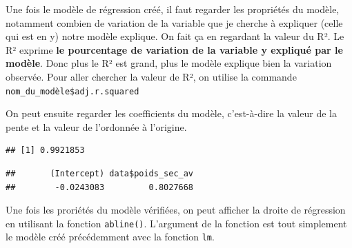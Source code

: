 \documentclass[
]{article}
\newenvironment{Shaded}{\begin{snugshade}}{\end{snugshade}}
\newcommand{\CommentTok}[1]{\textcolor[rgb]{0.56,0.35,0.01}{\textit{#1}}}
\newcommand{\KeywordTok}[1]{\textcolor[rgb]{0.13,0.29,0.53}{\textbf{#1}}}
\newcommand{\NormalTok}[1]{#1}
\newcommand{\OperatorTok}[1]{\textcolor[rgb]{0.81,0.36,0.00}{\textbf{#1}}}
\begin{document}
Une fois le modèle de régression créé, il faut regarder les propriétés
du modèle, notamment combien de variation de la variable que je cherche
à expliquer (celle qui est en y) notre modèle explique. On fait ça en
regardant la valeur du R². Le R² exprime \textbf{le pourcentage de
variation de la variable y expliqué par le modèle}. Donc plus le R² est
grand, plus le modèle explique bien la variation observée. Pour aller
chercher la valeur de R², on utilise la commande
\texttt{nom\_du\_modèle\$adj.r.squared}

On peut ensuite regarder les coefficients du modèle, c'est-à-dire la
valeur de la pente et la valeur de l'ordonnée à l'origine.

\begin{Shaded}
\end{Shaded}

\begin{verbatim}
## [1] 0.9921853
\end{verbatim}

\begin{Shaded}
\end{Shaded}

\begin{verbatim}
##       (Intercept) data$poids_sec_av 
##        -0.0243083         0.8027668
\end{verbatim}

Une fois les proriétés du modèle vérifiées, on peut afficher la droite
de régression en utilisant la fonction \texttt{abline()}. L'argument de
la fonction est tout simplement le modèle créé précédemment avec la
fonction \texttt{lm}.
\end{document}

